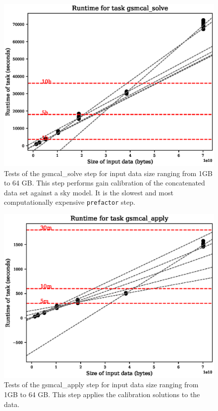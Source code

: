 \documentclass[preprint,5p]{elsarticle}
\begin{document}
\begin{figure}
    \includegraphics[width=0.95\linewidth]{figures/gsmcal_solve_size.eps}
      \caption{Tests of the gsmcal\_solve step for input data size ranging from 1GB to 64 GB. This step performs gain calibration of the concatenated data set against a sky model. It is the slowest and most computationally expensive \texttt{prefactor} step.  }
	\label{fig:gsmcalsolve_size}
\end{figure}

\begin{figure}
    \includegraphics[width=0.95\linewidth]{figures/gsmcal_apply_size.eps}
      \caption{Tests of the gsmcal\_apply step for input data size ranging from 1GB to 64 GB. This step applies the calibration solutions to the data. }
	\label{fig:gsmcalapply_size}
\end{figure}
\end{document}
